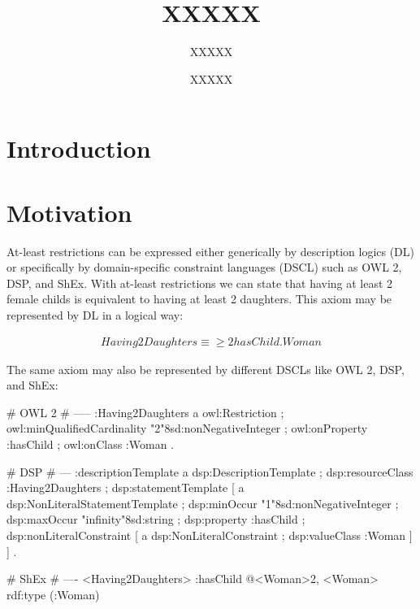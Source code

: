 \documentclass{llncs}
\begin{document}
%
%
\title{XXXXX}
%
%
\author{XXXXX \and XXXXX}
%
%

\maketitle              %

\begin{abstract}


\end{abstract}
%


\section{Introduction}

\section{Motivation}

At-least restrictions can be expressed either generically by description logics (DL) or specifically by domain-specific constraint languages (DSCL) such as OWL 2, DSP, and ShEx.
With at-least restrictions we can state that having at least 2 female childs is equivalent to having at least 2 daughters. This axiom may be represented by DL in a logical way:

\begin{align*}
Having2Daughters \equiv \geq 2 hasChild.Woman
\end{align*}

The same axiom may also be represented by different DSCLs like OWL 2, DSP, and ShEx:

\begin{ex}
# OWL 2
# -----
:Having2Daughters
    a owl:Restriction ;
    owl:minQualifiedCardinality "2"^^xsd:nonNegativeInteger ;
    owl:onProperty :hasChild ;
    owl:onClass :Woman .
		
# DSP
# ---			
:descriptionTemplate 
    a dsp:DescriptionTemplate ; 
    dsp:resourceClass :Having2Daughters ; 
    dsp:statementTemplate [
        a dsp:NonLiteralStatementTemplate ;
        dsp:minOccur "1"^^xsd:nonNegativeInteger ; 
        dsp:maxOccur "infinity"^^xsd:string ; 
        dsp:property :hasChild ; 
        dsp:nonLiteralConstraint [ 
            a dsp:NonLiteralConstraint ;
            dsp:valueClass :Woman ] ] .

# ShEx
# ----
<Having2Daughters> {         
    :hasChild @<Woman>{2, }
}
<Woman> {         
    rdf:type (:Woman)
}
\end{ex}
\end{document}
